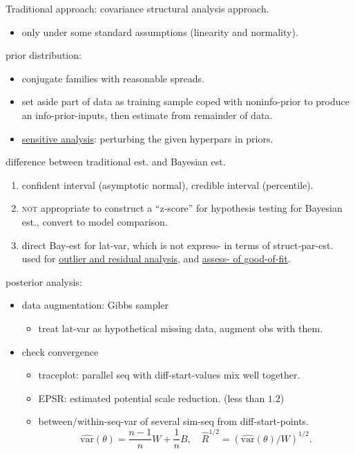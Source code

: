 \vspace{-1em}


Traditional approach: covariance structural analysis approach. \begin{itemize}
    \item only under some standard assumptions (linearity and normality).
\end{itemize}

prior distribution: \begin{itemize}
    \item conjugate families with reasonable spreads.
    \item set aside part of data as training sample coped  with noninfo-prior to produce an info-prior-inputs, then estimate from remainder of data.
    \item \underline{sensitive analysis}: perturbing the given hyperpars in priors.
\end{itemize}



difference between traditional est. and Bayesian est. \begin{enumerate}
    \item confident interval (asymptotic normal), credible interval (percentile).
    \item \textsc{not} appropriate to construct a ``z-score'' for hypothesis testing for Bayesian est., convert to model comparison.
    \item direct Bay-est for lat-var, which is not express- in terms of struct-par-est.
        used for \underline{outlier and residual analysis}, and \underline{assess- of good-of-fit}.
\end{enumerate}

posterior analysis: \begin{itemize}
    \item data augmentation: Gibbs sampler \begin{itemize}[leftmargin = 1em]
        \item treat lat-var as hypothetical missing data, augment obs with them.
    \end{itemize}
    \item check convergence \begin{itemize}[leftmargin = 1em]
        \item traceplot: parallel seq with diff-start-values mix well together.
        \item EPSR: estimated potential scale reduction. (less than $1.2$)
        \item [] between/within-seq-var of several sim-seq from diff-start-points.
        \[
            \widehat{\text{var}}(\theta) =\frac{n-1}{n}W + \frac{1}{n}B, 
            \quad \hat{R}^{1/2} = (\widehat{\text{var}}(\theta) / W)^{1/2}.
        \]
    \end{itemize}
\end{itemize}


